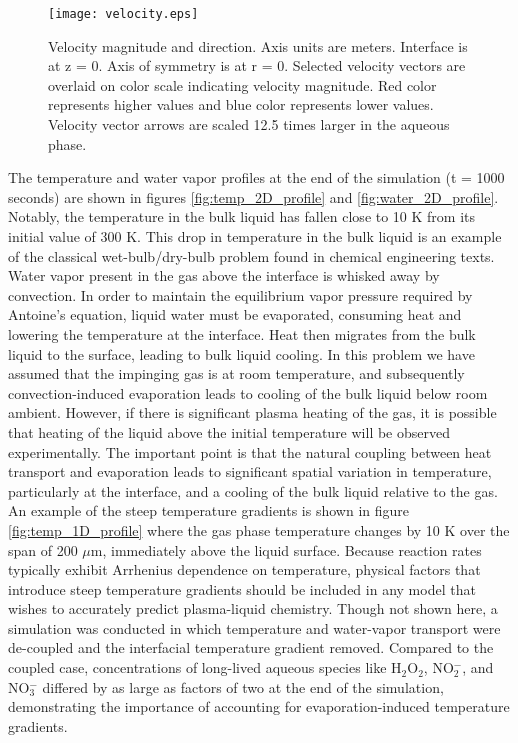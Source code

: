 \documentclass[12pt]{article}
\begin{document}
\begin{figure}[htb]
    \centering
        \texttt{[image: velocity.eps]}
    \caption{Velocity magnitude and direction. Axis units are meters. Interface is at z = 0. Axis of symmetry is at r = 0. Selected velocity vectors are overlaid on color scale indicating velocity magnitude. Red color represents higher values and blue color represents lower values. Velocity vector arrows are scaled 12.5 times larger in the aqueous phase.}
    \label{fig:v_field}
\end{figure}

The temperature and water vapor profiles at the end of the simulation (t = 1000 seconds) are shown in figures \ref{fig:temp_2D_profile} and \ref{fig:water_2D_profile}. Notably, the temperature in the bulk liquid has fallen close to 10 K from its initial value of 300 K. This drop in temperature in the bulk liquid is an example of the classical wet-bulb/dry-bulb problem found in chemical engineering texts. Water vapor present in the gas above the interface is whisked away by convection. In order to maintain the equilibrium vapor pressure required by Antoine's equation, liquid water must be evaporated, consuming heat and lowering the temperature at the interface. Heat then migrates from the bulk liquid to the surface, leading to bulk liquid cooling. In this problem we have assumed that the impinging gas is at room temperature, and subsequently convection-induced evaporation leads to cooling of the bulk liquid below room ambient. However, if there is significant plasma heating of the gas, it is possible that heating of the liquid above the initial temperature will be observed experimentally. The important point is that the natural coupling between heat transport and evaporation leads to significant spatial variation in temperature, particularly at the interface, and a cooling of the bulk liquid relative to the gas. An example of the steep temperature gradients is shown in figure \ref{fig:temp_1D_profile} where the gas phase temperature changes by 10 K over the span of 200 $\mu$m, immediately above the liquid surface. Because reaction rates typically exhibit Arrhenius dependence on temperature, physical factors that introduce steep temperature gradients should be included in any model that wishes to accurately predict plasma-liquid chemistry. Though not shown here, a simulation was conducted in which temperature and water-vapor transport were de-coupled and the interfacial temperature gradient removed. Compared to the coupled case, concentrations of long-lived aqueous species like H$_2$O$_2$, NO$_2^-$, and NO$_3^-$ differed by as large as factors of two at the end of the simulation, demonstrating the importance of accounting for evaporation-induced temperature gradients.  
\end{document}
